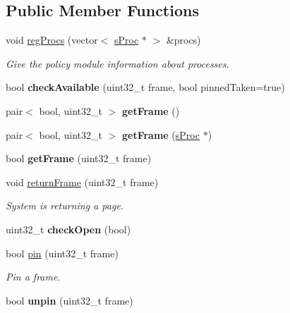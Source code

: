 \subsection*{\-Public \-Member \-Functions}
\begin{DoxyCompactItemize}
\item 
void \hyperlink{classcFixedAlloc_a489395f063815020f36265a52308a3f6}{reg\-Procs} (vector$<$ \hyperlink{structsProc}{s\-Proc} $\ast$ $>$ \&procs)
\begin{DoxyCompactList}\small\item\em \-Give the policy module information about processes. \end{DoxyCompactList}\item 
\hypertarget{classcFixedAlloc_a12285e88707a40ae51b5d2963dfea1aa}{bool {\bfseries check\-Available} (uint32\-\_\-t frame, bool pinned\-Taken=true)}\label{d1/d40/classcFixedAlloc_a12285e88707a40ae51b5d2963dfea1aa}

\item 
\hypertarget{classcFixedAlloc_a6a9ece4fe93de1473efe111d44830cd1}{pair$<$ bool, uint32\-\_\-t $>$ {\bfseries get\-Frame} ()}\label{d1/d40/classcFixedAlloc_a6a9ece4fe93de1473efe111d44830cd1}

\item 
\hypertarget{classcFixedAlloc_acc3148cce2f2880af5624c2a409eafb4}{pair$<$ bool, uint32\-\_\-t $>$ {\bfseries get\-Frame} (\hyperlink{structsProc}{s\-Proc} $\ast$)}\label{d1/d40/classcFixedAlloc_acc3148cce2f2880af5624c2a409eafb4}

\item 
\hypertarget{classcFixedAlloc_ad51c52d37f59f8a40eb315f35892bc98}{bool {\bfseries get\-Frame} (uint32\-\_\-t frame)}\label{d1/d40/classcFixedAlloc_ad51c52d37f59f8a40eb315f35892bc98}

\item 
void \hyperlink{classcFixedAlloc_a79df79853a015bb750ca682630afcfd8}{return\-Frame} (uint32\-\_\-t frame)
\begin{DoxyCompactList}\small\item\em \-System is returning a page. \end{DoxyCompactList}\item 
\hypertarget{classcFixedAlloc_a2109057465d037b0c23dba1257163aba}{uint32\-\_\-t {\bfseries check\-Open} (bool)}\label{d1/d40/classcFixedAlloc_a2109057465d037b0c23dba1257163aba}

\item 
bool \hyperlink{classcFixedAlloc_ae876cb2df8588fc96c2e6310478f773b}{pin} (uint32\-\_\-t frame)
\begin{DoxyCompactList}\small\item\em \-Pin a frame. \end{DoxyCompactList}\item 
\hypertarget{classcFixedAlloc_a2a6f869ad3c6fa6190fdbca3e198bae9}{bool {\bfseries unpin} (uint32\-\_\-t frame)}\label{d1/d40/classcFixedAlloc_a2a6f869ad3c6fa6190fdbca3e198bae9}

\end{DoxyCompactItemize}
